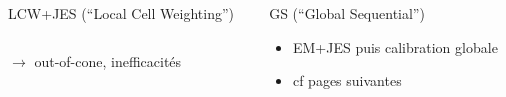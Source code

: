 \begin{frame}
\begin{columns}
\begin{column}{0.65\textwidth}
{\begin{block}{LCW+JES {\small (``Local Cell Weighting'')}}
\begin{columns}
\begin{column}{0.75\textwidth}
\begin{itemize}
$\rightarrow$ out-of-cone, inefficacit\'es 
\end{itemize}
\end{column}
\end{columns}
\end{block}
}
\end{column}
\pause
\begin{column}{0.35\textwidth}
{
\begin{block}{GS {\small (``Global Sequential'')}}
\begin{itemize}
\item EM+JES puis calibration globale
\item cf pages suivantes
\end{itemize}
\end{block}
}
\end{column}
\end{columns}

\end{frame}

